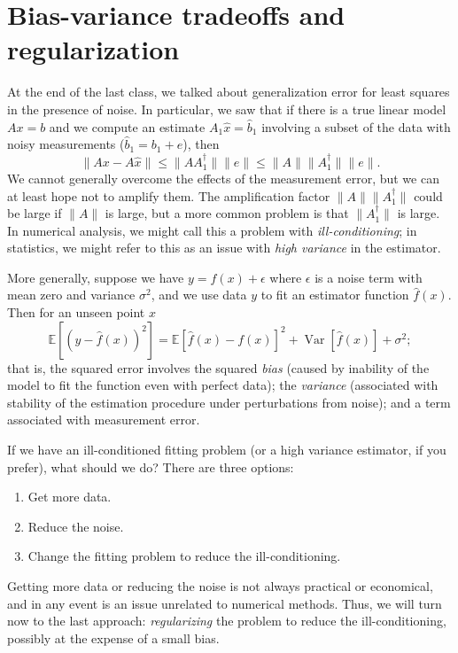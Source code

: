 \documentclass[12pt, leqno]{article} %
\begin{document}

\section{Bias-variance tradeoffs and regularization}

At the end of the last class, we talked about generalization error
for least squares in the presence of noise.  In particular, we saw
that if there is a true linear model $Ax = b$ and we compute an
estimate $A_1 \hat{x} = \hat{b}_1$ involving a subset of the data
with noisy measurements ($\hat{b}_1 = b_1 + e$), then
\[
  \|Ax-A\hat{x}\| \leq \|A A_1^\dagger\| \|e\| \leq \|A\| \|A_1^\dagger\| \|e\|.
\]
We cannot generally overcome the effects of the measurement error,
but we can at least hope not to amplify them.  The amplification factor
$\|A\| \|A_1^\dagger\|$ could be large if $\|A\|$ is large, but a more
common problem is that $\|A_1^\dagger\|$ is large.  In numerical
analysis, we might call this a problem with {\em ill-conditioning};
in statistics, we might refer to this as an issue with
{\em high variance} in the estimator.

More generally, suppose we have $y = f(x) + \epsilon$ where $\epsilon$
is a noise term with mean zero and variance $\sigma^2$, and we use
data $y$ to fit an estimator function $\hat{f}(x)$.  Then for an
unseen point $x$
\[
  \mathbb{E}[(y-\hat{f}(x))^2] =
  \mathbb{E}[\hat{f}(x)-f(x)]^2 +
  \operatorname{Var}[\hat{f}(x)] +
  \sigma^2;
\]
that is, the squared error involves the squared {\em bias} (caused by
inability of the model to fit the function even with perfect data);
the {\em variance} (associated with stability of the estimation
procedure under perturbations from noise); and a term associated
with measurement error.

If we have an ill-conditioned fitting problem (or a high variance
estimator, if you prefer), what should we do?  There are three
options:
\begin{enumerate}
\item
  Get more data.
\item
  Reduce the noise.
\item
  Change the fitting problem to reduce the ill-conditioning.
\end{enumerate}
Getting more data or reducing the noise is not always practical or
economical, and in any event is an issue unrelated to numerical
methods.  Thus, we will turn now to the last approach:
{\em regularizing} the problem to reduce the ill-conditioning,
possibly at the expense of a small bias.
\end{document}
